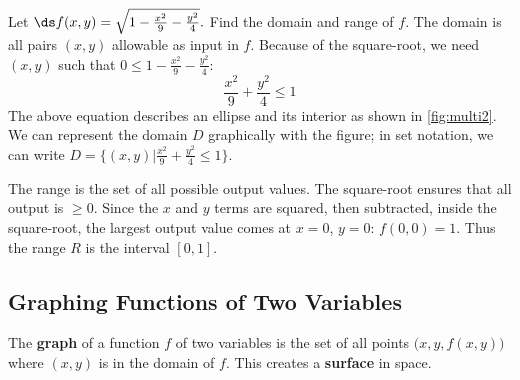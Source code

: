 \begin{example}\label{ex_multi2}%
Let $\ds f(x,y) = \sqrt{1-\frac{x^2}9-\frac{y^2}4}.$ Find the domain and range of $f$.
\solution
The domain is all pairs $(x,y)$ allowable as input in $f$. Because of the square-root, we need $(x,y)$ such that $0\leq1-\frac{x^2}9-\frac{y^2}4$:
\[\frac{x^2}9+\frac{y^2}4 \leq 1\]
The above equation describes an ellipse and its interior as shown in \autoref{fig:multi2}. We can represent the domain $D$ graphically with the figure; in set notation, we can write $D = \{(x,y)\vert\frac{x^2}9+\frac{y^2}4 \leq 1\}$.

The range is the set of all possible output values. The square-root ensures that all output is $\geq 0$. Since the $x$ and $y$ terms are squared, then subtracted, inside the square-root, the largest output value comes at $x=0$, $y=0$: $f(0,0) = 1$. Thus the range $R$ is the interval $[0,1]$.
\end{example}

\subsection{Graphing Functions of Two Variables}

The \textbf{graph} of a function $f$ of two variables is the set of all points $\bigl(x,y,f(x,y)\bigr)$ where $(x,y)$ is in the domain of $f$. This creates a \textbf{surface} in space.


